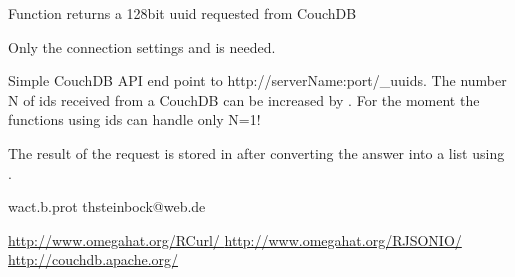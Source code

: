 \begin{Description}\relax
Function returns a 128bit uuid requested from CouchDB
\end{Description}
\begin{Arguments}
\begin{ldescription}
\item[\code{cdb}] Only the  connection settings  and
 is needed.

\end{ldescription}
\end{Arguments}
\begin{Details}\relax
Simple CouchDB API end point to http://serverName:port/\_uuids. The
number N of ids received from a CouchDB can be increased by
.
For the moment the functions using ids can handle only N=1!
\end{Details}
\begin{Value}
\begin{ldescription}
\item[\code{cdb }] The result of the request is stored in  after
converting the answer into a list using .

\end{ldescription}
\end{Value}
\begin{Author}\relax
wact.b.prot
thsteinbock@web.de
\end{Author}
\begin{References}\relax
\url{  http://www.omegahat.org/RCurl/        }
\url{  http://www.omegahat.org/RJSONIO/      }
\url{  http://couchdb.apache.org/            }
\end{References}
\begin{SeeAlso}\relax
{}
\end{SeeAlso}
\begin{Examples}
\end{Examples}

